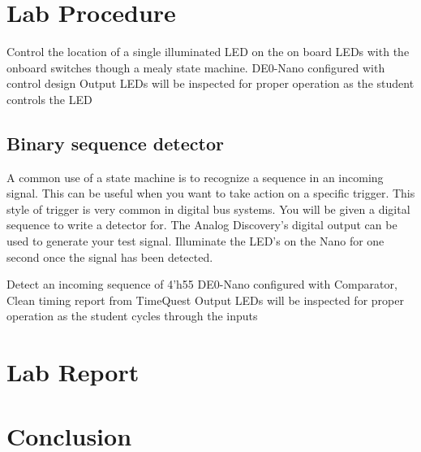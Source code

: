 \section{Lab Procedure}

    {Control the location of a single illuminated LED on the on board LEDs with the onboard switches though a mealy state machine.}
    {DE0-Nano configured with control design}
    {Output LEDs will be inspected for proper operation as the student controls the LED}

  \subsection{Binary sequence detector}
    A common use of a state machine is to recognize a sequence in an incoming signal. This can be useful when you want to take action on a specific trigger. This style of trigger is very common in digital bus systems. You will be given a digital sequence to write a detector for. The Analog Discovery's  digital output can be used to generate your test signal. Illuminate the LED's on the  Nano for one second once the signal has been detected.

      {Detect an incoming sequence of 4'h55}
      {DE0-Nano configured with Comparator, Clean timing report from TimeQuest}
      {Output LEDs will be inspected for proper operation as the student cycles through the inputs}

\section{ Lab Report}
  
\section{ Conclusion}
 


